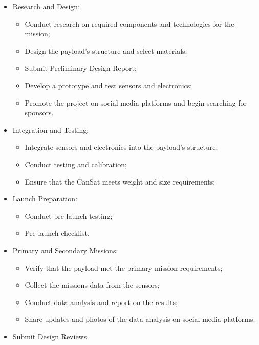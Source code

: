 \documentclass[11pt]{article}
\begin{document}
\begin{itemize}[leftmargin=1cm, itemindent=0.25cm, noitemsep, topsep=0pt, label=$\bullet$]
\begin{itemize}[label=, noitemsep, topsep=0pt]
    \end{itemize}
    \item Research and Design:
    \begin{itemize}[label=, noitemsep, topsep=0pt]
        \item Conduct research on required components and technologies for the mission;
        \item Design the payload's structure and select materials;
        \item Submit Preliminary Design Report;
        \item Develop a prototype and test sensors and electronics;
        \item Promote the project on social media platforms and begin searching for sponsors.
    \end{itemize}
    \item Integration and Testing:
    \begin{itemize}[label=, noitemsep, topsep=0pt]
        \item Integrate sensors and electronics into the payload's structure;
        \item Conduct testing and calibration;
        \item Ensure that the CanSat meets weight and size requirements;
    \end{itemize}
    \item Launch Preparation:
    \begin{itemize}[label=, noitemsep, topsep=0pt]
        \item Conduct pre-launch testing;
        \item Pre-launch checklist.
    \end{itemize}
    \item Primary and Secondary Missions:
    \begin{itemize}[label=, noitemsep, topsep=0pt]
        \item Verify that the payload met the primary mission requirements;
        \item Collect the missions data from the sensors;
        \item Conduct data analysis and report on the results;
        \item Share updates and photos of the data analysis on social media platforms.
    \end{itemize}
    \item Submit Design Reviews
    \begin{itemize}[label=, noitemsep, topsep=0pt]

\end{itemize}
\end{itemize}
\end{document}
